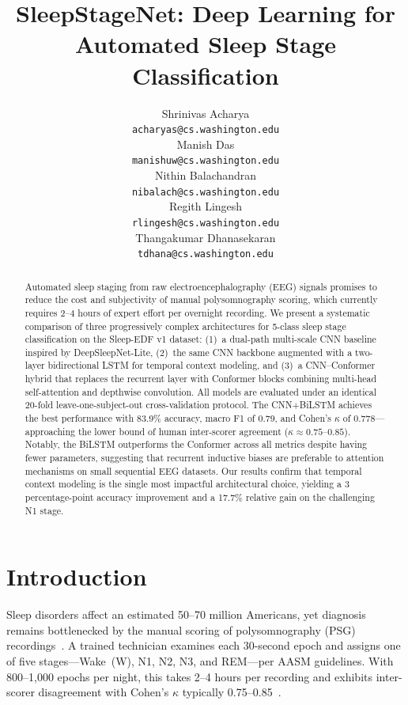 \documentclass[final]{article}
\title{SleepStageNet: Deep Learning for Automated Sleep Stage Classification}
\author{%
  Shrinivas Acharya \\
  \texttt{acharyas@cs.washington.edu} \\
  \And
  Manish Das \\
  \texttt{manishuw@cs.washington.edu} \\
  \AND
  Nithin Balachandran \\
  \texttt{nibalach@cs.washington.edu} \\
  \And
  Regith Lingesh \\
  \texttt{rlingesh@cs.washington.edu} \\
  \And
  Thangakumar Dhanasekaran \\
  \texttt{tdhana@cs.washington.edu} \\
}
\begin{document}
\maketitle

\begin{abstract}
Automated sleep staging from raw electroencephalography (EEG) signals promises to reduce the cost and subjectivity of manual polysomnography scoring, which currently requires 2--4 hours of expert effort per overnight recording. We present a systematic comparison of three progressively complex architectures for 5-class sleep stage classification on the Sleep-EDF v1 dataset: (1)~a dual-path multi-scale CNN baseline inspired by DeepSleepNet-Lite, (2)~the same CNN backbone augmented with a two-layer bidirectional LSTM for temporal context modeling, and (3)~a CNN--Conformer hybrid that replaces the recurrent layer with Conformer blocks combining multi-head self-attention and depthwise convolution. All models are evaluated under an identical 20-fold leave-one-subject-out cross-validation protocol. The CNN+BiLSTM achieves the best performance with 83.9\% accuracy, macro F1 of 0.79, and Cohen's $\kappa$ of 0.778---approaching the lower bound of human inter-scorer agreement ($\kappa \approx 0.75$--$0.85$). Notably, the BiLSTM outperforms the Conformer across all metrics despite having fewer parameters, suggesting that recurrent inductive biases are preferable to attention mechanisms on small sequential EEG datasets. Our results confirm that temporal context modeling is the single most impactful architectural choice, yielding a 3 percentage-point accuracy improvement and a 17.7\% relative gain on the challenging N1 stage.
\end{abstract}

\section{Introduction}

Sleep disorders affect an estimated 50--70 million Americans, yet diagnosis remains bottlenecked by the manual scoring of polysomnography (PSG) recordings~\cite{Berry2012}. A trained technician examines each 30-second epoch and assigns one of five stages---Wake~(W), N1, N2, N3, and REM---per AASM guidelines. With 800--1,000 epochs per night, this takes 2--4 hours per recording and exhibits inter-scorer disagreement with Cohen's $\kappa$ typically 0.75--0.85~\cite{Rosenberg2013}.
\end{document}
